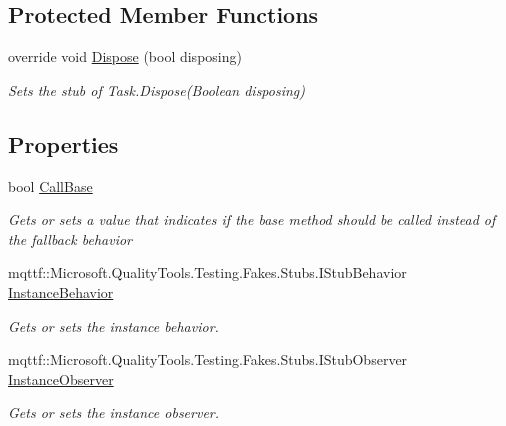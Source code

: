 \subsection*{Protected Member Functions}
\begin{DoxyCompactItemize}
\item 
override void \hyperlink{class_system_1_1_threading_1_1_tasks_1_1_fakes_1_1_stub_task_3_01_t_result_01_4_a3dfbcb0b410f7d9e95a3cd76a8ac79a2}{Dispose} (bool disposing)
\begin{DoxyCompactList}\small\item\em Sets the stub of Task.\-Dispose(\-Boolean disposing)\end{DoxyCompactList}\end{DoxyCompactItemize}
\subsection*{Properties}
\begin{DoxyCompactItemize}
\item 
bool \hyperlink{class_system_1_1_threading_1_1_tasks_1_1_fakes_1_1_stub_task_3_01_t_result_01_4_a0b918aae6fee25db61e55219e9a58f02}{Call\-Base}
\begin{DoxyCompactList}\small\item\em Gets or sets a value that indicates if the base method should be called instead of the fallback behavior\end{DoxyCompactList}\item 
mqttf\-::\-Microsoft.\-Quality\-Tools.\-Testing.\-Fakes.\-Stubs.\-I\-Stub\-Behavior \hyperlink{class_system_1_1_threading_1_1_tasks_1_1_fakes_1_1_stub_task_3_01_t_result_01_4_a54b552df7e85c8533e5a25b8063dec6c}{Instance\-Behavior}
\begin{DoxyCompactList}\small\item\em Gets or sets the instance behavior.\end{DoxyCompactList}\item 
mqttf\-::\-Microsoft.\-Quality\-Tools.\-Testing.\-Fakes.\-Stubs.\-I\-Stub\-Observer \hyperlink{class_system_1_1_threading_1_1_tasks_1_1_fakes_1_1_stub_task_3_01_t_result_01_4_aa43016c5bbd3a8c81e136a60b7b7b967}{Instance\-Observer}
\begin{DoxyCompactList}\small\item\em Gets or sets the instance observer.\end{DoxyCompactList}\end{DoxyCompactItemize}


